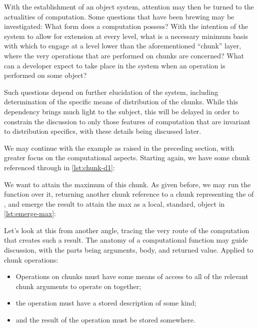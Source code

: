 With the establishment of an object system, attention may then be turned
to the actualities of computation. Some questions that have been brewing
may be investigated: What form does a computation possess? With the
intention of the system to allow for extension at every level, what is a
necessary minimum basis with which to engage at a level lower than the
aforementioned ``chunk'' layer, where the very operations that are
performed on chunks are concerned? What can a developer expect to take
place in the system when an operation is performed on some object?

Such questions depend on further elucidation of the system, including
determination of the specific means of distribution of the chunks. While
this dependency brings much light to the subject, this will be delayed
in order to constrain the discussion to only those features of
computation that are invariant to distribution specifics, with these
details being discussed later.

We may continue with the  example as raised in the preceding
section, with greater focus on the computational aspects. Starting
again, we have some chunk referenced through  in \cref{lst:chunk-d1}:


We want to attain the maximum of this chunk. As given before, we may run
the  function over it, returning another chunk reference to
a chunk representing the  of , and emerge the
result to attain the max as a local, standard, object in \cref{lst:emerge-max}:


Let's look at this from another angle, tracing the very route of the
computation that creates such a result. The anatomy of a computational
function may guide discussion, with the parts being arguments, body, and
returned value. Applied to chunk operations:

\begin{itemize}
    \item
          Operations on chunks must have some means of access to all of the
          relevant chunk arguments to operate on together;
    \item
          the operation must have a stored description of some kind;
    \item
          and the result of the operation must be stored somewhere.
\end{itemize}

